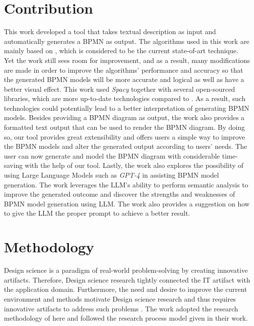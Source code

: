 \section{Contribution}
\label{sec:intro:con}


This work developed a tool that takes textual description as input and automatically generates a BPMN as output. The algorithms used in this work are mainly based on \cite{t2m_1}, which is considered to be the current state-of-art technique. Yet the work still sees room for improvement, and as a result, many modifications are made in order to improve the algorithms' performance and accuracy so that the generated BPMN models will be more accurate and logical as well as have a better visual effect. This work used \textit{Spacy} together with several open-sourced libraries, which are more up-to-date technologies compared to \cite{t2m_1}. As a result, such technologies could potentially lead to a better interpretation of generating BPMN models. Besides providing a BPMN diagram as output, the work also provides a formatted text output that can be used to render the BPMN diagram. By doing so, our tool provides great extensibility and offers users a simple way to improve the BPMN models and alter the generated output according to users' needs. The user can now generate and model the BPMN diagram with considerable time-saving with the help of our tool. Lastly, the work also explores the possibility of using Large Language Models such as \textit{GPT-4} in assisting BPMN model generation. The work leverages the LLM's ability to perform semantic analysis to improve the generated outcome and discover the strengths and weaknesses of BPMN model generation using LLM. The work also provides a suggestion on how to give the LLM the proper prompt to achieve a better result.

\section{Methodology}
\label{sec:intro:meth}

%


Design science is a paradigm of real-world problem-solving by creating innovative artifacts. Therefore, Design science research tightly connected the IT artifact with the application domain. Furthermore, the need and desire to improve the current environment and methods motivate Design science research and thus requires innovative artifacts to address such problems \cite{DSM_1}. The work adopted the research methodology of \cite{DSM_2} here and followed the research process model given in their work.

